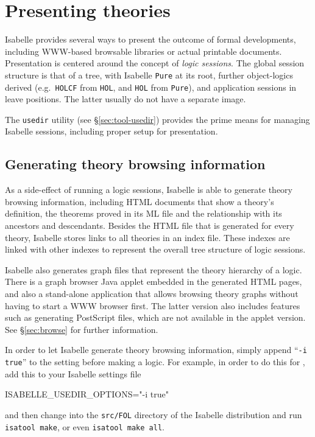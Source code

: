 

\chapter{Presenting theories}

Isabelle provides several ways to present the outcome of formal developments,
including WWW-based browsable libraries or actual printable documents.
Presentation is centered around the concept of \emph{logic sessions}.  The
global session structure is that of a tree, with Isabelle \texttt{Pure} at its
root, further object-logics derived (e.g.\ \texttt{HOLCF} from \texttt{HOL},
and \texttt{HOL} from \texttt{Pure}), and application sessions in leave
positions.  The latter usually do not have a separate {\ML} image.

The \texttt{usedir} utility (see \S\ref{sec:tool-usedir}) provides the prime
means for managing Isabelle sessions, including proper setup for presentation.


\section{Generating theory browsing information} \label{sec:info}

As a side-effect of running a logic sessions, Isabelle is able to generate
theory browsing information, including HTML documents that show a theory's
definition, the theorems proved in its ML file and the relationship with its
ancestors and descendants.  Besides the HTML file that is generated for every
theory, Isabelle stores links to all theories in an index file. These indexes
are linked with other indexes to represent the overall tree structure of logic
sessions.

Isabelle also generates graph files that represent the theory hierarchy of a
logic.  There is a graph browser Java applet embedded in the generated HTML
pages, and also a stand-alone application that allows browsing theory graphs
without having to start a WWW browser first.  The latter version also includes
features such as generating {\sc PostScript} files, which are not available in
the applet version.  See \S\ref{sec:browse} for further information.

\medskip

In order to let Isabelle generate theory browsing information, simply append
``\texttt{-i true}'' to the  setting before
making a logic.  For example, in order to do this for {\FOL}, add this to your
Isabelle settings file
\begin{ttbox}
ISABELLE_USEDIR_OPTIONS="-i true"
\end{ttbox}
and then change into the \texttt{src/FOL} directory of the Isabelle
distribution and run \texttt{isatool make}, or even \texttt{isatool make all}.

